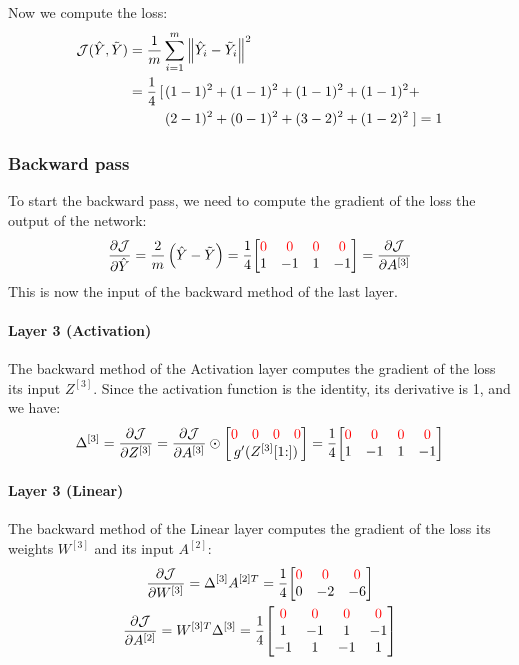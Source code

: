 Now we compute the loss:
\begin{align*}
    \mathcal{J}(\hat{Y}, \tilde{Y}) &= \frac{1}{m} \sum_{i=1}^{m} \norm{\hat{Y}_i - \tilde{Y}_i}^2\\
    &\;\begin{aligned}
        = \frac{1}{4} \left[\right.&(1 - 1)^2 + (1 - 1)^2 + (1 - 1)^2 + (1 - 1)^2 + \\
        &(2 - 1)^2 + (0 - 1)^2 + (3 - 2)^2 + (1 - 2)^2\left.\right] = 1
    \end{aligned}
\end{align*}

\subsubsection{Backward pass}
To start the backward pass, we need to compute the gradient of the loss \wrt the output of the network:
\begin{equation*}
    \frac{\partial \J}{\partial \hat{Y}} = \frac{2}{m} \left(\hat{Y} - \tilde{Y}\right) = \frac{1}{4} \mqty[
        \color{red} 0 & \color{red} 0 & \color{red} 0 & \color{red} 0 \\
        1 & -1 & 1 & -1
    ] = \pdv{\J}{A^{[3]}}
\end{equation*}
This is now the input of the backward method of the last layer.

\paragraph{Layer 3 (Activation)} The backward method of the Activation layer computes the gradient of the loss \wrt its input $Z^{[3]}$. Since the activation function is the identity, its derivative is 1, and we have:
\begin{equation*}
    \Delta^{[3]} = \pdv{\J}{Z^{[3]}} = \pdv{\J}{A^{[3]}} \odot \mqty[
        \mqty{\color{red} 0 & \color{red} 0 & \color{red} 0 & \color{red} 0} \\
        g'(Z^{[3]}[1\hspace{-0.6ex}:])
    ] = \frac{1}{4} \mqty[
        \color{red} 0 & \color{red} 0 & \color{red} 0 & \color{red} 0 \\
        1 & -1 & 1 & -1
    ]
\end{equation*}

\paragraph{Layer 3 (Linear)} The backward method of the Linear layer computes the gradient of the loss \wrt its weights $W^{[3]}$ and its input $A^{[2]}$:
\begin{gather*}
    \pdv{\J}{W^{[3]}} = \Delta^{[3]} A^{[2]T} = \frac{1}{4} \mqty[
        \color{red} 0 & \color{red} 0 & \color{red} 0 \\
        0 & -2 & -6
    ]\\
    \pdv{\J}{A^{[2]}} = W^{[3]T} \Delta^{[3]} = \frac{1}{4} \mqty[
        \color{red} 0 & \color{red} 0 & \color{red} 0 & \color{red} 0 \\
        1 & -1 & 1 & -1 \\
        -1 & 1 & -1 & 1
    ]
\end{gather*}

